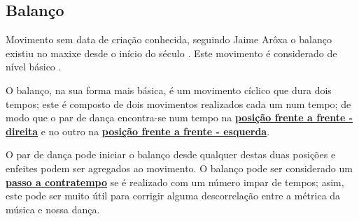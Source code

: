 \subsection{Balanço}

Movimento sem data de criação conhecida, 
seguindo Jaime Arôxa o balanço existiu no maxixe desde o início do século \cite{EntrevistaJaimeAroxa1}.
Este movimento é considerado de nível básico \cite[pp. 144]{perna2002samba}.

O balanço, na sua forma mais básica, é um movimento cíclico que dura dois tempos;
este é composto de dois movimentos realizados cada um num tempo; de modo que
o par de dança encontra-se num tempo na
\hyperref[def:ffd-position]{\textbf{posição frente a frente - direita}}
e no outro na
\hyperref[def:ffe-position]{\textbf{posição frente a frente - esquerda}}.


O par de dança pode iniciar o balanço desde qualquer destas duas posições
e enfeites podem ser agregados ao movimento.
O balanço pode ser considerado um 
\hyperref[def:PassoAContratempo]{\textbf{passo a contratempo}} 
se é realizado com um número impar de tempos; asim, este pode ser muito útil para 
corrigir alguma descorrelação entre a métrica da música e nossa dança.


